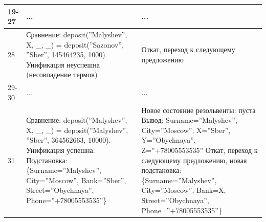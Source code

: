 \documentclass[12pt]{report}
\begin{document}
\begin{table}[H]
\begin{center}
\begin{tabular}{|p{1 cm}|p{11 cm}|p{7 cm}|}
			\hline
			19-27 & ... & ... \\
			\hline
			28 & Сравнение: \newline deposit(''Malyshev'', X, \_, \_) = \newline deposit(''Sazonov'', ''Sber'', 145464235, 1000). \newline Унификация неуспешна (несовпадение термов) & Откат, переход к следующему предложению \\
			\hline
			29-30 & ... & ... \\
			\hline
			31 & Сравнение: \newline deposit(''Malyshev'', X, \_, \_) = \newline deposit(''Malyshev'', ''Sber'', 364562663, 10000).  \newline Унификация успешна. \newline Подстановка: \{Surname=''Malyshev'', City=''Moscow'', Bank=''Sber'', Street=''Obychnaya'', Phone=''+78005553535''\} & Новое состояние резольвенты: пуста \newline Вывод: Surname=''Malyshev'', City=''Moscow'', X=''Sber'', Y=''Obychnaya'', Z=''+78005553535'' \newline Откат, переход к следующему предложению, новая подстановка: \{Surname=''Malyshev'', City=''Moscow'', Bank=X, Street=''Obychnaya'', Phone=''+78005553535''\} \\
			\hline
		\end{tabular}
	\end{center}
\end{table} 
\end{document}
